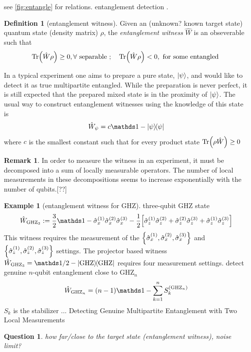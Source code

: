 \documentclass[
10pt,
aps,
pra,
linenumbers,
floatfix,
]{revtex4-2}
\theoremstyle{plain}
\newtheorem{question}{Question}
\theoremstyle{definition}
\newtheorem{definition}{Definition}
\newtheorem{example}{Example}
\newtheorem{remark}{Remark}
\newcommand{\ew}{\hat{W}}
\newcommand{\ghz}{\text{GHZ}}
\newcommand{\dm}{\rho}
\begin{document}
see \cref{fig:entangle} for relations.
entanglement detection \cite{guhneEntanglementDetection2009}.
\begin{definition}[entanglement witness]\label{def:entanglement_witness}
	Given an (unknown? known target state) quantum state (density matrix) $\dm$, the \emph{entanglement witness} $\ew$ is an obseverable such that
	\begin{equation}
		\Tr(\ew\dm) \ge 0 , \forall \text{ separable };\quad
		\Tr(\ew\dm) < 0 , \text{ for some entangled }
	\end{equation}
\end{definition}
In a typical experiment one aims to prepare a pure state, $\ket{\psi}$, and would like to detect it as true multipartite entangled. 
While the preparation is never perfect, it is still expected that the prepared mixed state is in the proximity of $\ket{\psi}$. The usual way to construct entanglement witnesses using the knowledge of this state is
\begin{equation}
	\ew_{\psi} = c\identity - \op{\psi} 
	\label{eq:entanglement_witness}
\end{equation}
where $c$ is the smallest constant such that for every product state $\Tr(\dm\ew)\ge 0$
\begin{remark}
In order to measure the witness in an experiment, it must be decomposed into a sum of locally measurable operators. The number of local measurements in these decompositions seems to increase exponentially with the number of qubits.[??]
\end{remark}
\begin{example}[entanglement witness for GHZ]
	three-qubit GHZ state 
	\cite{tothDetectingGenuineMultipartite2005}
	\begin{equation}
		\ew_{\ghz_3} := \frac{3}{2} \identity - \sx^{(1)}\sx^{(2)}\sx^{(3)}
		- \frac{1}{2} \qty[
			\sz^{(1)} \sz^{(2)} + 
			\sz^{(2)} \sz^{(3)} + 
			\sz^{(1)} \sz^{(3)} 
		]
	\end{equation}
	This witness requires the measurement of the $\qty{\hat{\sigma}_x^{(1)},\hat{\sigma}_x^{(2)},\hat{\sigma}_x^{(3)}}$ and $\qty{\hat{\sigma}_z^{(1)},\hat{\sigma}_z^{(2)},\hat{\sigma}_z^{(3)}}$ settings.
	The projector based witness $\ew_{\ghz_3}=\identity/2 - \op{\ghz}$ requires four measurement settings.
	detect genuine $n$-qubit entanglement close to $\ghz_n$
	\begin{equation}
		\ew_{\ghz_n} = (n-1) \identity - \sum_{k=1}^n S_k^{(\ghz_n)}
	\end{equation}
	$S_k$ is the stabilizer ... \cite{tothEntanglementDetectionStabilizer2005}
	Detecting Genuine Multipartite Entanglement with Two Local Measurements \cite{tothDetectingGenuineMultipartite2005}
\end{example}
\begin{question}
	how far/close to the target state (entanglement witness), noise limit?
\end{question}
\end{document}

